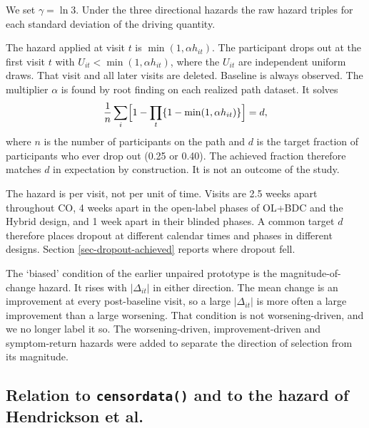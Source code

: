 \documentclass[
  11pt,
]{article}
\begin{document}
We set \(\gamma = \ln 3\). Under the three directional hazards the raw
hazard triples for each standard deviation of the driving quantity.

The hazard applied at visit \(t\) is \(\min(1, \alpha h_{it})\). The
participant drops out at the first visit \(t\) with \(U_{it} <
\min(1, \alpha h_{it})\), where the \(U_{it}\) are independent uniform
draws. That visit and all later visits are deleted. Baseline is always
observed. The multiplier \(\alpha\) is found by root finding on each
realized path dataset. It solves
\[\frac{1}{n}\sum_i \Bigl[1 - \prod_t \{1 - \min(1, \alpha
h_{it})\}\Bigr] = d,\]
where \(n\) is the number of participants on the path and \(d\) is the
target fraction of participants who ever drop out (0.25 or 0.40). The
achieved fraction therefore matches \(d\) in expectation by construction.
It is not an outcome of the study.

The hazard is per visit, not per unit of time. Visits are 2.5 weeks
apart throughout CO, 4 weeks apart in the open-label phases of OL+BDC
and the Hybrid design, and 1 week apart in their blinded phases. A
common target \(d\) therefore places dropout at different calendar times
and phases in different designs. Section \ref{sec-dropout-achieved}
reports where dropout fell.

The `biased' condition of the earlier unpaired prototype is the
magnitude-of-change hazard. It rises with \(|\Delta_{it}|\) in either
direction. The mean change is an improvement at every post-baseline
visit, so a large \(|\Delta_{it}|\) is more often a large improvement
than a large worsening. That condition is not worsening-driven, and we
no longer label it so. The worsening-driven, improvement-driven and
symptom-return hazards were added to separate the direction of
selection from its magnitude.

\subsection{\texorpdfstring{Relation to \texttt{censordata()} and to the hazard of Hendrickson et al.~}{Relation to censordata() and to the hazard of Hendrickson et al.~}}\label{sec-censordata}
\end{document}
